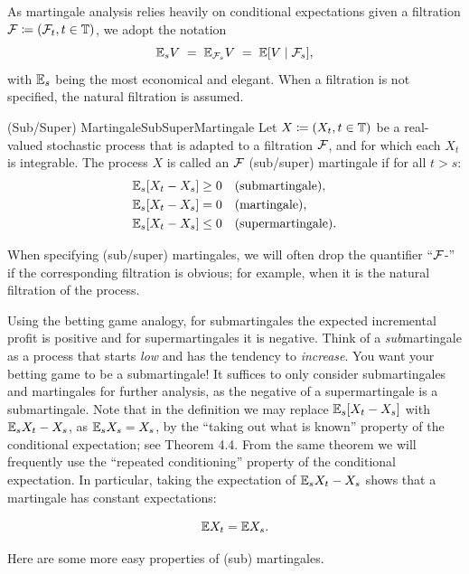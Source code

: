 As martingale analysis relies heavily on conditional expectations given a filtration \(\mathcal{F} \coloneqq (\mathcal{F}_t, t \in \mathbb{T})\), we adopt the notation
\[
	\mathbb{E}_s V \;=\; \mathbb{E}_{\mathcal{F}_s} V \;=\; \mathbb{E}[V \mid \mathcal{F}_s],
\]
with \(\mathbb{E}_s\) being the most economical and elegant. When a filtration is not specified, the natural filtration is assumed.

\begin{defn}{(Sub/Super) Martingale}{SubSuperMartingale}
	Let \(X \coloneqq (X_t, t \in \mathbb{T})\) be a real-valued stochastic process that is adapted to a filtration \(\mathcal{F}\), and for which each \(X_t\) is integrable. The process \(X\) is called an \(\mathcal{F}\)\text{-} (sub/super) martingale if for all \(t > s\):
	\begin{equation}\label{eq:MartingaleDef}
		\begin{aligned}
			\mathbb{E}_s[X_t - X_s] & \ge 0 &  & \text{(submartingale)},   \\
			\mathbb{E}_s[X_t - X_s] & = 0   &  & \text{(martingale)},      \\
			\mathbb{E}_s[X_t - X_s] & \le 0 &  & \text{(supermartingale)}.
		\end{aligned}
	\end{equation}
\end{defn}

When specifying (sub/super) martingales, we will often drop the quantifier “\(\mathcal{F}\)-” if the corresponding filtration is obvious; for example, when it is the natural filtration of the process.

Using the betting game analogy, for submartingales the expected incremental profit is positive and for supermartingales it is negative. Think of a \textit{sub}martingale as a process that starts \textit{low} and has the tendency to \textit{increase}. You want your betting game to be a submartingale! It suffices to only consider submartingales and martingales for further analysis, as the negative of a supermartingale is a submartingale. Note that in the definition we may replace \(\mathbb{E}_s[X_t - X_s]\) with \(\mathbb{E}_s X_t - X_s\), as \(\mathbb{E}_s X_s = X_s\), by the “taking out what is known” property of the conditional expectation; see Theorem 4.4. From the same theorem we will frequently use the “repeated conditioning” property of the conditional expectation. In particular, taking the expectation of \(\mathbb{E}_s X_t - X_s\) shows that a martingale has constant expectations:

\[
	\mathbb{E} X_t = \mathbb{E} X_s.
\]

Here are some more easy properties of (sub) martingales.

